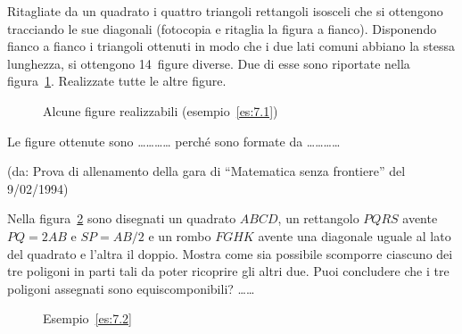\begin{exrig}
\noindent\begin{minipage}{0.65\textwidth}\parindent15pt
\begin{esempio}\label{es:7.1}
Ritagliate da un quadrato i quattro triangoli rettangoli isosceli che 
si ottengono tracciando le sue diagonali (fotocopia e ritaglia la 
figura a fianco). Disponendo fianco a fianco i triangoli ottenuti in 
modo che i due lati comuni abbiano la stessa lunghezza, si ottengono 
14~figure diverse. Due di esse sono riportate nella 
figura~\ref{fig:quadrato2}. Realizzate tutte le altre figure.
\end{esempio}
\end{minipage}\hfil
\begin{minipage}{0.35\textwidth}
	\centering
\end{minipage}\vspace{5pt}


\begin{inaccessibleblock}
 \begin{figure}[!htb]
\centering
\caption{Alcune figure realizzabili 
(esempio~\ref{es:7.1})}\label{fig:quadrato2}
\end{figure}
\end{inaccessibleblock}

Le figure ottenute sono \ldots\ldots\ldots\ldots{} perché sono 
formate da \ldots\ldots\ldots\ldots{}

\noindent(da: Prova di allenamento della gara di ``Matematica senza 
frontiere'' del 9/02/1994)

\begin{esempio}\label{es:7.2}
Nella figura~\ref{fig:figure} sono disegnati un quadrato \(ABCD\), un 
rettangolo \(PQRS\) avente \(PQ=2AB\) e \(SP=AB/2\) e un rombo \(FGHK\) 
avente una diagonale uguale al lato del quadrato e l'altra il doppio. 
Mostra come sia possibile scomporre ciascuno dei tre poligoni in parti 
tali da poter ricoprire gli altri due. Puoi concludere che i tre 
poligoni assegnati sono equiscomponibili? \ldots\ldots{}


\begin{inaccessibleblock}
 \begin{figure}[!htb]
	\centering
	\caption{Esempio~\ref{es:7.2}}\label{fig:figure}
\end{figure}
\end{inaccessibleblock}


\end{esempio}
\end{exrig}
